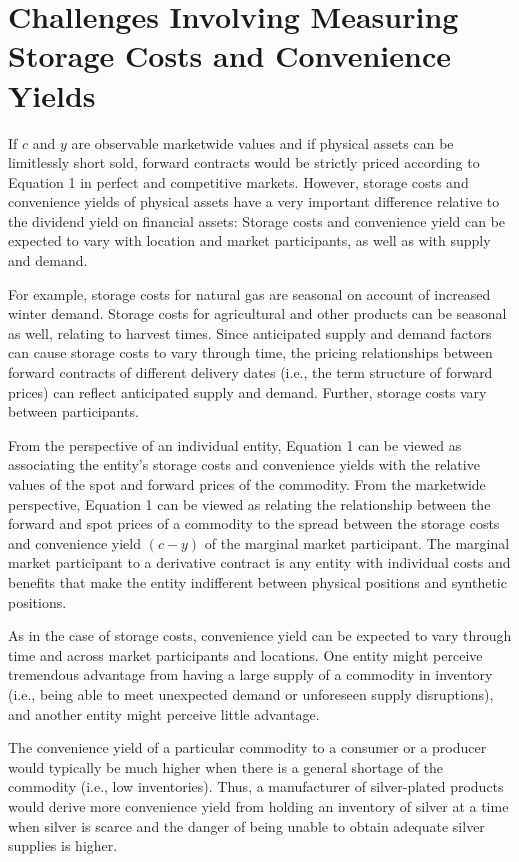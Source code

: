 \documentclass[11pt]{article}
\begin{document}
\section*{Challenges Involving Measuring Storage Costs and Convenience Yields}
If $c$ and $y$ are observable marketwide values and if physical assets can be limitlessly short sold, forward contracts would be strictly priced according to Equation 1 in perfect and competitive markets. However, storage costs and convenience yields of physical assets have a very important difference relative to the dividend yield on financial assets: Storage costs and convenience yield can be expected to vary with location and market participants, as well as with supply and demand.

For example, storage costs for natural gas are seasonal on account of increased winter demand. Storage costs for agricultural and other products can be seasonal as well, relating to harvest times. Since anticipated supply and demand factors can cause storage costs to vary through time, the pricing relationships between forward contracts of different delivery dates (i.e., the term structure of forward prices) can reflect anticipated supply and demand. Further, storage costs vary between participants.

From the perspective of an individual entity, Equation 1 can be viewed as associating the entity's storage costs and convenience yields with the relative values of the spot and forward prices of the commodity. From the marketwide perspective, Equation 1 can be viewed as relating the relationship between the forward and spot prices of a commodity to the spread between the storage costs and convenience yield $(c-y)$ of the marginal market participant. The marginal market participant to a derivative contract is any entity with individual costs and benefits that make the entity indifferent between physical positions and synthetic positions.

As in the case of storage costs, convenience yield can be expected to vary through time and across market participants and locations. One entity might perceive tremendous advantage from having a large supply of a commodity in inventory (i.e., being able to meet unexpected demand or unforeseen supply disruptions), and another entity might perceive little advantage.

The convenience yield of a particular commodity to a consumer or a producer would typically be much higher when there is a general shortage of the commodity (i.e., low inventories). Thus, a manufacturer of silver-plated products would derive more convenience yield from holding an inventory of silver at a time when silver is scarce and the danger of being unable to obtain adequate silver supplies is higher.
\end{document}
